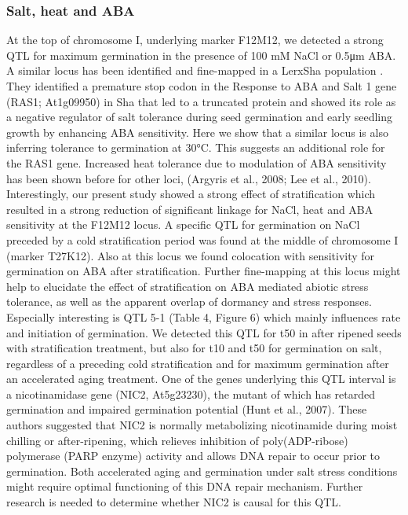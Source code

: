 \documentclass[8pt, twoside, a5paper]{report}
\begin{document}
\subsubsection{Salt, heat and ABA}
At the top of chromosome I, underlying marker F12M12, we detected a strong QTL for maximum germination in the presence of 100 mM NaCl or 0.5μm ABA. A similar
locus has been identified and fine-mapped in a LerxSha population \cite{Ren:2010}. They identified a premature stop codon in the Response to ABA and Salt 1
gene (RAS1; At1g09950) in Sha that led to a truncated protein and showed its role as a negative regulator of salt tolerance during seed germination and early seedling growth by
enhancing ABA sensitivity. Here we show that a similar locus is also inferring tolerance to germination at 30°C. This suggests an additional role for the RAS1
gene. Increased heat tolerance due to modulation of ABA sensitivity has been shown before for other loci, (Argyris et al., 2008; Lee et al., 2010). Interestingly, our present study showed a strong
effect of stratification which resulted in a strong reduction of significant linkage for NaCl, heat and ABA sensitivity at the F12M12 locus. A specific QTL for germination on NaCl
preceded by a cold stratification period was found at the middle of chromosome I (marker T27K12). Also at this locus we found colocation with sensitivity for germination on ABA
after stratification. Further fine-mapping at this locus might help to elucidate the effect of stratification on ABA mediated abiotic stress tolerance, as well as the apparent overlap of
dormancy and stress responses. Especially interesting is QTL 5-1 (Table 4, Figure 6) which mainly influences rate and initiation of germination. We detected this QTL for t50 in after 
ripened seeds with stratification treatment, but also for t10 and t50 for germination on salt, regardless of a preceding cold stratification and for maximum germination after an accelerated aging
treatment. One of the genes underlying this QTL interval is a nicotinamidase gene (NIC2, At5g23230), the mutant of which has retarded germination and impaired germination potential 
(Hunt et al., 2007). These authors suggested that NIC2 is normally metabolizing nicotinamide during moist chilling or after-ripening, which relieves inhibition of poly(ADP-ribose) 
polymerase (PARP enzyme) activity and allows DNA repair to occur prior to germination. Both accelerated aging and germination under salt stress conditions might require optimal 
functioning of this DNA repair mechanism. Further research is needed to determine whether NIC2 is causal for this QTL.
\end{document}
